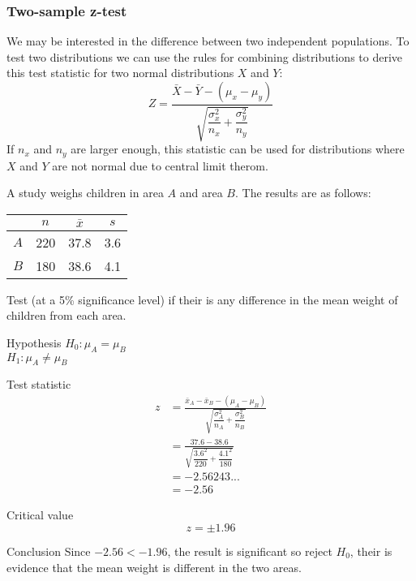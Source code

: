         \subsubsection{Two-sample z-test}
            We may be interested in the difference between two independent populations. To test two distributions we can use the rules for combining distributions to derive this test statistic for two normal distributions $X$ and $Y$: 
            $$Z = \frac{\bar{X} - \bar{Y} - (\mu_x - \mu_y)} {\sqrt{\dfrac{\sigma_x^2}{n_x}+\dfrac{\sigma_y^2}{n_y}}} $$
            If $n_x$ and $n_y$ are larger enough, this statistic can be used for distributions where $X$ and $Y$ are not normal due to central limit therom.

            \begin{example}
            {
                A study weighs children in area $A$ and area $B$. The results are as follows:
                
                \begin{center}
                \begin{tabular}{l|c|c|c}
                    & $n$ & $\bar{x}$ & $s$ \\
                \hline
                $A$ & 220 & 37.8      & 3.6 \\
                $B$ & 180 & 38.6      & 4.1
                \end{tabular}
                \end{center}
                
                Test (at a 5\% significance level) if their is any difference in the mean weight of children from each area.
            }

            \begin{step}{Hypothesis}
            $H_0: \mu_A = \mu_B$ \\ 
            $H_1: \mu_A \neq \mu_B$
            \end{step}

            \begin{step}{Test statistic} 
            \begin{align*} 
            z &= \frac{\bar{x}_A-\bar{x}_B - (\mu_A - \mu_B)}{\sqrt{\dfrac{\sigma_A^2}{n_A}+\dfrac{\sigma_B^2}{n_B}}}\\ 
            &= \frac{37.6 - 38.6}{\sqrt{\dfrac{3.6^2}{220}+\dfrac{4.1^2}{180}}}\\ 
            &= -2.56243...\\ 
            &= -2.56 
            \end{align*}
            \end{step}

            \begin{step}{Critical value}
            $$z = \pm1.96$$
            \end{step}

            \begin{step}{Conclusion}
            Since $-2.56 < -1.96$, the result is significant so reject $H_0$, their is evidence that the mean weight is different in the two areas.
            \end{step}

            \end{example}
